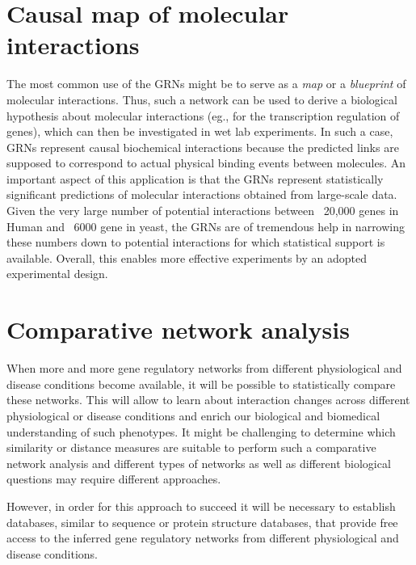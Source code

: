 \documentclass[oneside, a4paper, 11pt]{book}
\begin{document}
\section{Causal map of molecular interactions}
The most common use of the GRNs might be to serve as a \textit{map} or a \textit{blueprint} of molecular interactions. Thus, such a network can be used to derive a biological hypothesis about molecular interactions (eg., for the transcription regulation of genes), which can then be investigated in wet lab experiments. In such a case, GRNs represent causal biochemical interactions because the predicted links are supposed to correspond to actual physical binding events between molecules. An important aspect of this application is that the GRNs represent statistically significant predictions of molecular interactions obtained from large-scale data. Given the very large number of potential interactions between ~20,000 genes in Human and ~6000 gene in yeast, the GRNs are of tremendous help in narrowing these numbers down to potential interactions for which statistical support is available. Overall, this enables more effective experiments by an adopted experimental design.

\section{Comparative network analysis}
When more and more gene regulatory networks from different physiological and disease conditions become available, it will be possible to statistically compare these networks. This will allow to learn about interaction changes across different physiological or disease conditions and enrich our biological and biomedical understanding of such phenotypes. It might be challenging to determine which similarity or distance measures are suitable to perform such a comparative network analysis and different types of networks as well as different biological questions may require different approaches.

However, in order for this approach to succeed it will be necessary to establish databases, similar to sequence or protein structure databases, that provide free access to the inferred gene regulatory networks from different physiological and disease conditions.
\end{document}
